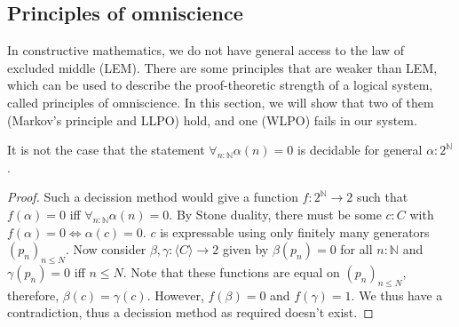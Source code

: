\subsection{Principles of omniscience}
In constructive mathematics, we do not have general access to the law of excluded middle (LEM).
There are some principles that are weaker than LEM, which can be used to describe 
the proof-theoretic strength of a logical system, called principles of omniscience.
In this section, we will show that two of them (Markov's principle and LLPO) hold, 
and one (WLPO) fails in our system.

\begin{theorem}\label{NotWLPO}
  It is not the case that the statement %
  $\forall_{n:\mathbb N} \alpha(n) = 0$ is decidable for general $\alpha:2^\mathbb N$. 
\end{theorem}
\begin{proof}
  Such a decission method would give a function $f:2^\mathbb N \to 2$ such that 
  $f(\alpha) = 0$ iff $\forall_{n:\mathbb N} \alpha (n)= 0$. 
  By Stone duality, there must be some $c:C$ with 
  $f(\alpha) = 0 \iff \alpha(c) = 0$. 
  $c$ is expressable using only finitely many generators $(p_n)_{n\leq N}$. 
  Now consider $\beta,\gamma:\langle C \rangle \to 2$ given by $\beta(p_n) = 0$ for all $n:\mathbb N$ and
  $\gamma(p_n) = 0$ iff $n\leq N$. 
  Note that these functions are equal on $(p_n)_{n\leq N}$, therefore, $\beta(c) = \gamma(c)$. 
  However, $f(\beta) = 0$ and $f(\gamma) = 1$.
  We thus have a contradiction, thus a decission method as required doesn't exist. 
\end{proof}

